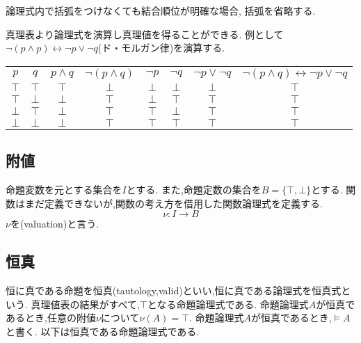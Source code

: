 論理式内で括弧をつけなくても結合順位が明確な場合, 括弧を省略する.

真理表より論理式を演算し真理値を得ることができる.
例として
$\lnot (p \land p) \leftrightarrow  \lnot p \lor \lnot q$(ド・モルガン律)を演算する.
\begin{center}
 \begin{tabular}{|c c||c|c||c|c|c||c|}
  \hline
  $p$ & $q$ &
		  $p \land q$ & $\lnot (p \land q)$ &
				  $\lnot p$ & $\lnot q$ & $\lnot p \lor \lnot q$ &
							  $\lnot (p \land q) \leftrightarrow \lnot p \lor \lnot q$ \\
  \hhline{|==#=|=#=|=|=#=|}
  $\top$ & $\top$ & $\top$ & $\bot$ & $\bot$ & $\bot$ & $\bot$ & $\top$ \\
  \hline
  $\top$ & $\bot$ & $\bot$ & $\top$ & $\bot$ & $\top$ & $\top$ & $\top$ \\
  \hline
  $\bot$ & $\top$ & $\bot$ & $\top$ & $\top$ & $\bot$ & $\top$ & $\top$ \\
  \hline
  $\bot$ & $\bot$ & $\bot$ & $\top$ & $\top$ & $\top$ & $\top$ & $\top$ \\
  \hline
 \end{tabular}
\end{center}

\subsection{附値}
命題変数を元とする集合を$I$とする. また,命題定数の集合を$B=\{\top,\bot\}$とする.
関数はまだ定義できないが,関数の考え方を借用した関数論理式を定義する.
\begin{equation*}
 \nu:I \to B
\end{equation*}
$\nu$を(valuation)と言う.

\subsection{恒真}
恒に真である命題を恒真(tautology,valid)といい,恒に真である論理式を恒真式という.
真理値表の結果がすべて,$\top$となる命題論理式である.
命題論理式$A$が恒真であるとき,任意の附値$\nu$について$\nu(A)=\top$.
命題論理式$A$が恒真であるとき,$\models A$と書く.
以下は恒真である命題論理式である.

